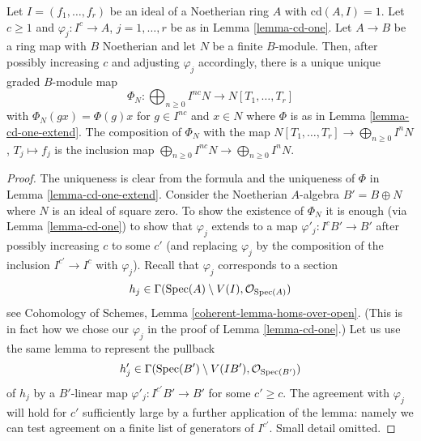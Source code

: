 \begin{lemma}
\label{lemma-cd-one-extend-to-module}
Let $I = (f_1, \ldots, f_r)$ be an ideal of a Noetherian ring $A$
with $\text{cd}(A, I) = 1$. Let $c \geq 1$ and $\varphi_j : I^c \to A$,
$j = 1, \ldots, r$ be as in Lemma \ref{lemma-cd-one}.
Let $A \to B$ be a ring map with $B$ Noetherian and let $N$ be
a finite $B$-module. Then, after possibly increasing $c$
and adjusting $\varphi_j$ accordingly, there is a unique
unique graded $B$-module map
$$
\Phi_N : \bigoplus\nolimits_{n \geq 0} I^{nc}N \to N[T_1, \ldots, T_r]
$$
with $\Phi_N(g x) = \Phi(g) x$ for $g \in I^{nc}$ and $x \in N$
where $\Phi$ is as in Lemma \ref{lemma-cd-one-extend}.
The composition of $\Phi_N$ with the map
$N[T_1, \ldots, T_r] \to \bigoplus_{n \geq 0} I^nN$,
$T_j \mapsto f_j$ is the inclusion map
$\bigoplus_{n \geq 0} I^{nc}N \to \bigoplus_{n \geq 0} I^nN$.
\end{lemma}

\begin{proof}
The uniqueness is clear from the formula and the uniqueness of $\Phi$ in
Lemma \ref{lemma-cd-one-extend}. Consider the Noetherian $A$-algebra
$B' = B \oplus N$ where $N$ is an ideal of square zero. To show
the existence of $\Phi_N$ it is enough
(via Lemma \ref{lemma-cd-one}) to show that $\varphi_j$ extends to
a map $\varphi'_j : I^cB' \to B'$ after possibly increasing $c$
to some $c'$ (and replacing $\varphi_j$ by the composition of the inclusion
$I^{c'} \to I^c$ with $\varphi_j$). Recall that $\varphi_j$ corresponds to a
section
$$
h_j \in \Gamma(\mathop{\mathrm{Spec}}(A) \setminus V(I), \mathcal{O}_{\mathop{\mathrm{Spec}}(A)})
$$
see Cohomology of Schemes, Lemma \ref{coherent-lemma-homs-over-open}.
(This is in fact how we chose our $\varphi_j$ in the proof of
Lemma \ref{lemma-cd-one}.) Let us use the same lemma to represent the pullback
$$
h'_j \in \Gamma(\mathop{\mathrm{Spec}}(B') \setminus V(IB'), \mathcal{O}_{\mathop{\mathrm{Spec}}(B')})
$$
of $h_j$ by a $B'$-linear map
$\varphi'_j : I^{c'}B' \to B'$ for some $c' \geq c$.
The agreement with $\varphi_j$ will hold for $c'$
sufficiently large by a further application of the lemma:
namely we can test agreement on a finite list of generators of $I^{c'}$.
Small detail omitted.
\end{proof}

